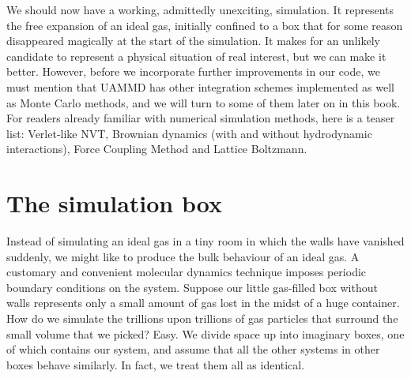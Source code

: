 We should now have a working, admittedly unexciting, simulation. It represents 
the free expansion of an ideal gas, initially confined to a box that for some 
reason disappeared magically at the start of the simulation. It makes for an 
unlikely candidate to represent a physical situation of real interest, but we 
can make it better. However, before we incorporate further improvements in our 
code, we must mention that UAMMD has other integration schemes implemented as 
well as Monte Carlo methods, and we will turn to some of them later on in this 
book. For readers already familiar with numerical simulation methods, here is a 
teaser list: Verlet-like NVT, Brownian dynamics (with and without hydrodynamic 
interactions), Force Coupling Method and Lattice Boltzmann.

\section{\label{simulation_box}The simulation box}

Instead of simulating an ideal gas in a tiny room in which the walls have 
vanished suddenly, we might like to produce the bulk behaviour of an ideal gas. 
A customary and convenient molecular dynamics technique imposes periodic 
boundary conditions on the system. Suppose our little gas-filled box without 
walls represents only a small amount of gas lost in the midst of a huge 
container. How do we simulate the trillions upon trillions of gas particles that 
surround the small volume that we picked? Easy. We divide space up into 
imaginary boxes, one of which contains our system, and assume that all the other 
systems in other boxes behave similarly. In fact, we treat them all as 
identical.

